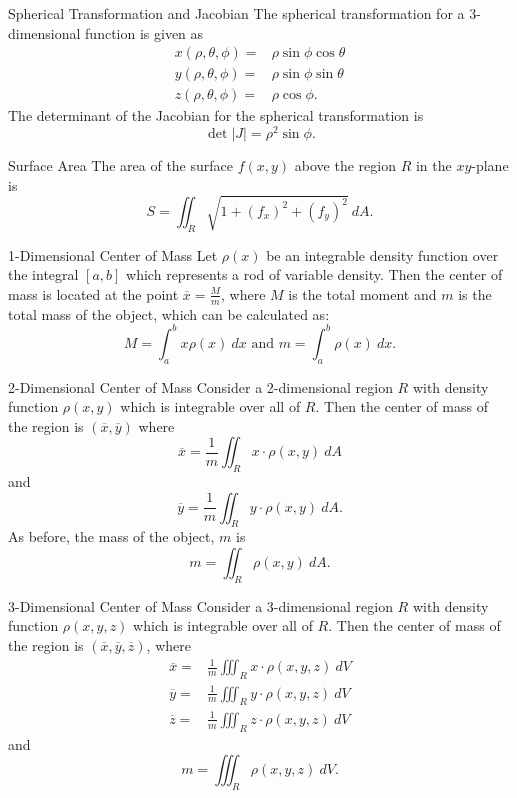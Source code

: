 \begin{definition}{Spherical Transformation and Jacobian}
The spherical transformation for a 3-dimensional function is given as 
\begin{align*}
x(\rho,\theta,\phi)=&\rho\sin\phi\cos\theta\\
y(\rho,\theta,\phi)=&\rho\sin\phi\sin\theta\\
z(\rho,\theta,\phi)=&\rho\cos\phi.
\end{align*}
The determinant of the Jacobian for the spherical transformation is $$\det|J|=\rho^2\sin\phi. $$
\end{definition}

\begin{definition}{Surface Area}
The area of the surface $f(x,y)$ above the region $R$ in the $xy$-plane is $$S=\iint_R \sqrt{1+(f_x)^2+(f_y)^2}\ dA. $$
\end{definition}

\begin{definition}{1-Dimensional Center of Mass}
Let $\rho(x)$ be an integrable density function over the integral $[a,b]$ which represents a rod of variable density. Then the center of mass is located at the point $\overline{x}=\frac{M}{m}$, where $M$ is the total moment and $m$ is the total mass of the object, which can be calculated as:
$$M=\int_a^b x\rho(x)\ dx\text{ and }m=\int_a^{b}\rho(x)\ dx.$$
\end{definition}

\begin{definition}{2-Dimensional Center of Mass}
Consider a 2-dimensional region $R$ with density function $\rho(x,y)$ which is integrable over all of $R$. Then the center of mass of the region is $(\overline{x},\overline{y})$ where $$\overline{x}=\frac{1}{m}\iint_R x\cdot\rho(x,y) \ dA $$ and $$\overline{y}=\frac{1}{m}\iint_R y\cdot\rho(x,y)\ dA.$$
As before, the mass of the object, $m$ is $$m=\iint_R \rho(x,y)\ dA. $$
\end{definition}

\begin{definition}{3-Dimensional Center of Mass}
Consider a 3-dimensional region $R$ with density function $\rho(x,y,z)$ which is integrable over all of $R$. Then the center of mass of the region is $(\overline{x},\overline{y},\overline{z})$, where
 \begin{align*}
 \overline{x}=&\frac{1}{m}\iiint_R x\cdot\rho(x,y,z) \ dV \\
 \overline{y}=&\frac{1}{m}\iiint_R y\cdot\rho(x,y,z)\ dV \\
 \overline{z}=&\frac{1}{m}\iiint_R z\cdot\rho(x,y,z)\ dV
 \end{align*}
 and $$m=\iiint_R \rho(x,y,z)\ dV. $$
\end{definition}

